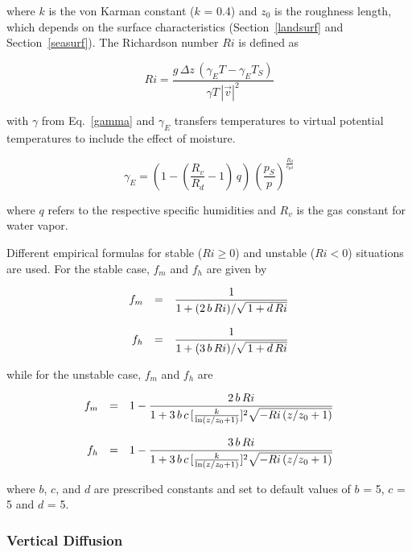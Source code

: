 where $k$ is the von Karman constant  ($k$ = 0.4) and
$z_0$ is the roughness length, which depends on the
surface characteristics (Section~\ref{landsurf} and
Section~\ref{seasurf}). The Richardson
number $Ri$ is
defined as

\begin{equation}
Ri=\frac{g\, \Delta z \,(\gamma_E T - \gamma_E T_S)}{\gamma T
\, |\vec{v}|^2} 
\end{equation}

with $\gamma$ from Eq.~\ref{gamma} and $\gamma_E$ transfers temperatures to virtual
potential temperatures to include the effect of moisture.

\begin{equation}\label{gammaE}
\gamma_E =  \left(1- \left(\frac{R_v}{R_d}-1\right)\, q
\right)
\,\left(\frac{p_S}{p}\right)^{\frac{R_d}{c_{pd}}}
\end{equation}
 

where $q$ refers to the respective specific humidities and
$R_v$ is the gas constant for  water
vapor.   

Different empirical formulas for stable ($Ri \ge 0$)
and
unstable ($Ri < 0$) situations are used. For the stable
case, $f_m$ and $f_h$ are given by 

\begin{equation}\label{fmfh1}
\begin{array}{rcl}
\displaystyle  f_m & = &\displaystyle  \frac{1}{1+(2\,b\,Ri) /\sqrt{\,1+ d\,
Ri}}
\\
&& \\
\displaystyle f_h & = &\displaystyle  \frac{1}{1+(3\,b\,Ri) /\sqrt{\,1+ d\,
Ri}}
\end{array}
\end{equation}

while for the unstable case,  $f_m$ and $f_h$ are

\begin{equation}\label{fmfh2}
\begin{array}{rcl}
\displaystyle f_m & = & \displaystyle 1- \frac{2\,b\,Ri}{1+3\,b\,c\, [
\frac{k}{\ln(z/z_0+1)}]^2\sqrt{-Ri\, (z/z_0+1)}} \\
&& \\
\displaystyle f_h & = &\displaystyle  1- \frac{3\,b\,Ri}{1+3\,b\,c\, [
\frac{k}{\ln(z/z_0+1)}]^2\sqrt{-Ri\, (z/z_0+1)}}
\end{array}
\end{equation}

where $b$, $c$, and $d$ are prescribed constants and
set
to
default values of  $b$ = 5,  $c$ = 5 and $d$ = 5.

\subsubsection{Vertical Diffusion}

